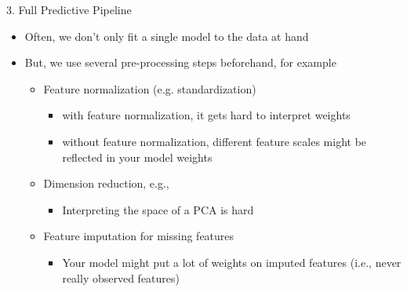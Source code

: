 \documentclass[aspectratio=169]{../latex_main/tntbeamer}  %
\begin{document}
    
        \begin{frame}[c]{3. Full Predictive Pipeline}
    
        \begin{itemize}
            \item Often, we don't only fit a single model to the data at hand
            \item But, we use several pre-processing steps beforehand, for example
            \begin{itemize}
                \item Feature normalization (e.g. standardization)
                \begin{itemize}
                    \item with feature normalization, it gets hard to interpret weights
                    \item without feature normalization, different feature scales might be reflected in your model weights
                \end{itemize}
                \pause
                \item Dimension reduction, e.g., 
                \begin{itemize}
                    \item Interpreting the space of a PCA is hard
                \end{itemize}
                \pause
                \item Feature imputation for missing features
                \begin{itemize}
                    \item Your model might put a lot of weights on imputed features (i.e., never really observed features) 
                \end{itemize}
            \end{itemize}
            
        \end{itemize}
    
    \end{frame}
    
    
\end{document}
